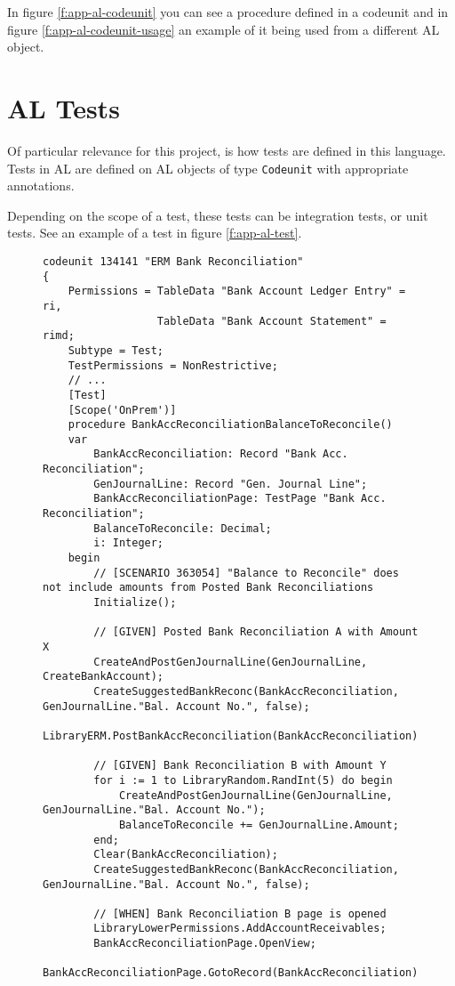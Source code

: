 In figure \ref{f:app-al-codeunit} you can see a procedure defined in a codeunit and in figure \ref{f:app-al-codeunit-usage}
an example of it being used from a different AL object.

\section{AL Tests}

Of particular relevance for this project, is how tests are defined in this language. Tests in AL are defined
 on AL objects of type \texttt{Codeunit} with appropriate annotations.

Depending on the scope of a test, these tests can be integration tests, or unit tests. See
an example of a test in figure \ref{f:app-al-test}.

\begin{figure}
    \begin{Verbatim}[fontsize=\tiny]
codeunit 134141 "ERM Bank Reconciliation"
{
    Permissions = TableData "Bank Account Ledger Entry" = ri,
                  TableData "Bank Account Statement" = rimd;
    Subtype = Test;
    TestPermissions = NonRestrictive;
    // ...
    [Test]
    [Scope('OnPrem')]
    procedure BankAccReconciliationBalanceToReconcile()
    var
        BankAccReconciliation: Record "Bank Acc. Reconciliation";
        GenJournalLine: Record "Gen. Journal Line";
        BankAccReconciliationPage: TestPage "Bank Acc. Reconciliation";
        BalanceToReconcile: Decimal;
        i: Integer;
    begin
        // [SCENARIO 363054] "Balance to Reconcile" does not include amounts from Posted Bank Reconciliations
        Initialize();

        // [GIVEN] Posted Bank Reconciliation A with Amount X
        CreateAndPostGenJournalLine(GenJournalLine, CreateBankAccount);
        CreateSuggestedBankReconc(BankAccReconciliation, GenJournalLine."Bal. Account No.", false);
        LibraryERM.PostBankAccReconciliation(BankAccReconciliation);

        // [GIVEN] Bank Reconciliation B with Amount Y
        for i := 1 to LibraryRandom.RandInt(5) do begin
            CreateAndPostGenJournalLine(GenJournalLine, GenJournalLine."Bal. Account No.");
            BalanceToReconcile += GenJournalLine.Amount;
        end;
        Clear(BankAccReconciliation);
        CreateSuggestedBankReconc(BankAccReconciliation, GenJournalLine."Bal. Account No.", false);

        // [WHEN] Bank Reconciliation B page is opened
        LibraryLowerPermissions.AddAccountReceivables;
        BankAccReconciliationPage.OpenView;
        BankAccReconciliationPage.GotoRecord(BankAccReconciliation);


\end{Verbatim}
\end{figure}
